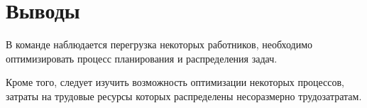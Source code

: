 \chapter{Выводы}

В команде наблюдается перегрузка некоторых работников, необходимо оптимизировать процесс планирования и распределения задач.

Кроме того, следует изучить возможность оптимизации некоторых процессов, затраты на трудовые ресурсы которых распределены несоразмерно трудозатратам.
